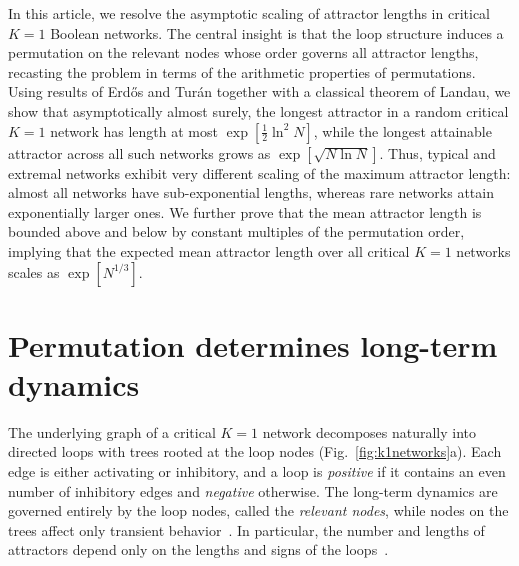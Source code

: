 \documentclass[11pt, reqno]{elsarticle}%
\theoremstyle{plain}
\begin{document}
In this article, we resolve the asymptotic scaling of attractor lengths in 
critical $K=1$ Boolean networks. 
The central insight is that the loop structure induces a permutation on the relevant nodes whose order governs all attractor lengths, recasting the problem in terms of the arithmetic properties of permutations. 
Using results of Erd\H{o}s and Tur\'an together with a classical theorem of Landau, we show that asymptotically almost surely, the longest attractor in a random critical $K=1$ network has length at most $\exp[\tfrac{1}{2}\ln^2 N]$, while the longest attainable attractor across all 
such networks grows as $\exp[\sqrt{N\ln N}]$. 
Thus, typical and extremal networks exhibit very different scaling of the maximum attractor length: almost all networks have sub-exponential lengths, whereas rare networks attain exponentially larger ones.
We further prove that the mean attractor length is bounded above and below by constant multiples of the permutation order, implying that the expected mean attractor length over all critical $K=1$ networks scales as $\exp[N^{1/3}]$.

\section*{Permutation determines long-term dynamics}
The underlying graph of a 
critical $K=1$ network decomposes naturally into directed loops with 
trees rooted at the loop nodes (Fig.~\ref{fig:k1networks}a). Each edge is either activating or 
inhibitory, and a loop is \emph{positive} if it contains an even 
number of inhibitory edges and \emph{negative} otherwise. The 
long-term dynamics are governed entirely by the loop nodes, called 
the \emph{relevant nodes}, while nodes on the trees affect only 
transient behavior~\cite{flybjergexact,drosselreview}. In 
particular, the number and lengths of attractors depend only on the lengths and signs of the loops~\cite{demongeot2010number,Golomb2017}.
\end{document}
